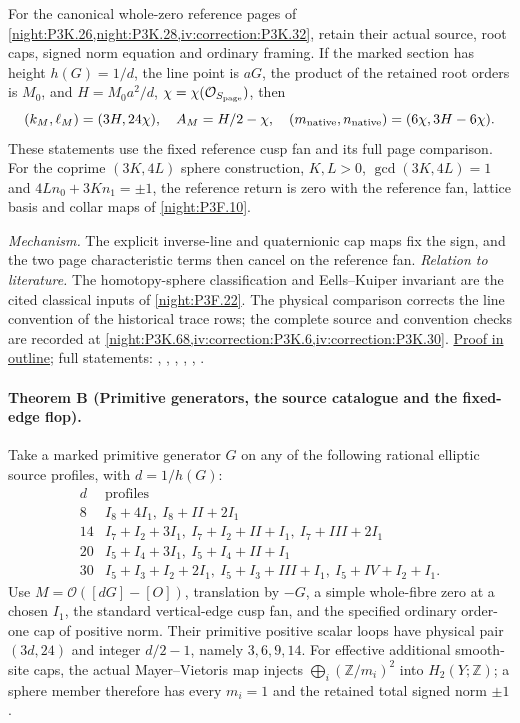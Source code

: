 For the canonical whole-zero reference pages of
\cref{night:P3K.26,night:P3K.28,iv:correction:P3K.32}, retain their
actual source, root caps, signed norm equation and ordinary framing.
If the marked section has height $h(G)=1/d$, the line point is $aG$,
the product of the retained root orders is $M_0$, and
$H=M_0a^2/d$, $\chi=\chi(\mathcal O_{S_{\rm page}})$, then
\[
 (k_M,\ell_M)=(3H,24\chi),\quad A_M=H/2-\chi,
 \quad(m_{\rm native},n_{\rm native})=(6\chi,3H-6\chi).
\]
These statements use the fixed reference cusp fan and its full page
comparison. For the coprime $(3K,4L)$ sphere construction,
$K,L>0$, $\gcd(3K,4L)=1$ and
$4Ln_0+3Kn_1=\pm1$, the reference return is zero with the reference
fan, lattice basis and collar maps of \cref{night:P3F.10}.

\textit{Mechanism.} The explicit inverse-line and quaternionic cap maps fix the sign,
and the two page characteristic terms then cancel on the reference fan.
\textit{Relation to literature.} The homotopy-sphere classification and Eells--Kuiper invariant are
the cited classical inputs of \cref{night:P3F.22}. The physical
comparison corrects the line convention of the historical trace rows;
the complete source and convention checks are recorded at
\cref{night:P3K.68,iv:correction:P3K.6,iv:correction:P3K.30}.
\hyperlink{outline-IV-A}{Proof in outline}; full statements: , , , , , .

\hypertarget{main-IV-B}{}
\paragraph{Theorem B (Primitive generators, the source catalogue and the fixed-edge flop).}
\label{series:IV:B}
Take a marked primitive generator $G$ on any of the following rational
elliptic source profiles, with $d=1/h(G)$:
\[
\begin{array}{c|l}
d&\text{profiles}\\\hline
8&I_8+4I_1,\ I_8+II+2I_1\\
14&I_7+I_2+3I_1,\ I_7+I_2+II+I_1,\ I_7+III+2I_1\\
20&I_5+I_4+3I_1,\ I_5+I_4+II+I_1\\
30&I_5+I_3+I_2+2I_1,\ I_5+I_3+III+I_1,\ I_5+IV+I_2+I_1.
\end{array}
\]
Use $M=\mathcal O([dG]-[O])$, translation by $-G$, a simple
whole-fibre zero at a chosen $I_1$, the standard vertical-edge cusp
fan, and the specified ordinary order-one cap of positive norm.
Their primitive positive scalar loops have physical pair $(3d,24)$
and integer $d/2-1$, namely $3,6,9,14$.
For effective additional smooth-site caps, the actual Mayer--Vietoris
map injects $\bigoplus_i(\mathbb Z/m_i)^2$ into $H_2(Y;\mathbb Z)$;
a sphere member therefore has every $m_i=1$ and the retained total
signed norm $\pm1$.

